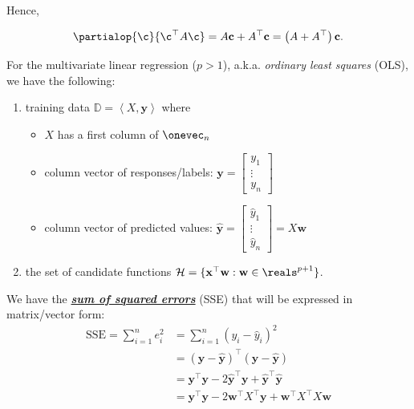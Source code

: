 \documentclass[12pt]{article}
\begin{document}
\begin{enumerate}
\begin{tcolorbox}[colback = white, sharp corners]
\vspace{3mm}

Hence, 

\[
	\partialop{\c}{\c^\top A \c} = A \mathbf{c} + A^\top \mathbf{c} = \left( A + A^\top \right)\mathbf{c}.
\]

\end{tcolorbox}

\newpage

\begin{tcolorbox}[colback=white, sharp corners]

For the multivariate linear regression ($p > 1$), a.k.a. \emph{ordinary least squares} (OLS), we have the following:
\begin{enumerate}
 \item training data $\mathbb{D} =  \left\langle X, \mathbf{y} \right\rangle$ where 
 \begin{itemize}
 \item $X$ has a first column of $\onevec_n$
 \item column vector of responses/labels: $\mathbf{y} = \begin{bmatrix} y_1 \\ \vdots \\ y_n \end{bmatrix} $
 \item column vector of predicted values: $ \hat{\mathbf{y}} = \begin{bmatrix} \hat{y}_1 \\ \vdots \\ \hat{y}_n \end{bmatrix} = X\mathbf{w}$
 \end{itemize}
 \item the set of candidate functions $\mathcal{H} = \lbrace \mathbf{x}^\top \mathbf{w} : \mathbf{w} \in \reals^{p+1} \rbrace$.
 \end{enumerate}

We have the \emph{\textbf{\underline{sum of squared errors}}} (SSE) that will be expressed in matrix/vector form: 
\begin{align*}
	\mathrm{SSE} = \sum_{i=1}^n e_i^2 &= \sum_{i=1}^n \left( y_i - \hat{y}_i \right)^2\\
	&= \left( \mathbf{y} - \mathbf{\hat{y}} \right)^\top \left( \mathbf{y} - \mathbf{\hat{y}} \right)\\
	&= \mathbf{y}^\top \mathbf{y} - 2 \mathbf{\hat{y}}^\top \mathbf{y} + \mathbf{\hat{y}}^\top \mathbf{\hat{y}} \\
	&= \mathbf{y}^\top \mathbf{y} - 2 \mathbf{w}^\top X^\top \mathbf{y} + \mathbf{w}^\top X^\top X \mathbf{w}
\end{align*}


\end{tcolorbox}
\end{enumerate}
\end{document}
